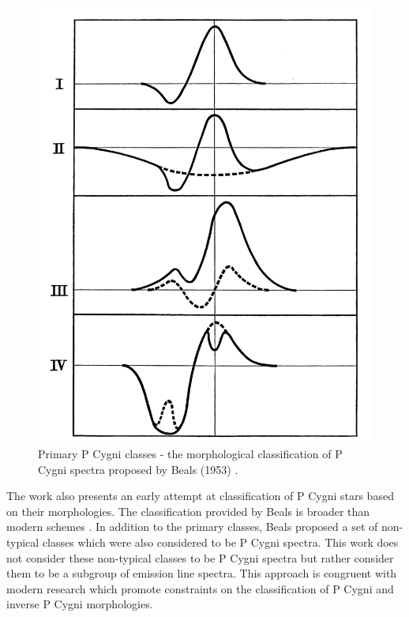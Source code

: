\begin{figure}[t]
\centering
\includegraphics[scale=.30]{figures/beals class 1.png}
\caption{Primary P Cygni classes - the morphological classification of P Cygni spectra proposed by Beals (1953) \cite{1953PDAO....9....1B}.}
\end{figure}

The work also presents an early attempt at classification of P Cygni stars based on their morphologies. The classification provided by Beals is broader than modern schemes \cite{reipurth1996halpha}. In addition to the primary classes, Beals proposed a set of non-typical classes which were also considered to be P Cygni spectra. This work does not consider these non-typical classes to be P Cygni spectra but rather consider them to be a subgroup of emission line spectra. This approach is congruent with modern research \cite{vcotar2021galah}\cite{zhang2021catalog}\cite{reipurth1996halpha} which promote constraints on the classification of P Cygni and inverse P Cygni morphologies. 


